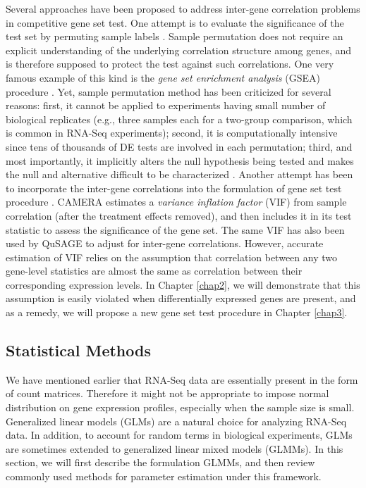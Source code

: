 Several approaches have been proposed to address inter-gene correlation problems in competitive gene
set test. One attempt is to evaluate the significance of the test set by permuting sample labels
\citep{efron2007testing,gatti2010heading,subramanian2005gene}. Sample permutation does not require
an explicit understanding of the underlying correlation structure among genes, and is therefore
supposed to protect the test against such correlations. One very famous example of this kind is the
\textit{gene set enrichment analysis} (GSEA) procedure \citep{subramanian2005gene}. Yet, sample
permutation method has been criticized for several reasons: first, it cannot be applied to
experiments having small
number of biological replicates (e.g., three samples each for a two-group comparison, which is common in RNA-Seq experiments);
second, it is computationally intensive since tens of thousands of DE tests are involved in each permutation; 
third, and most importantly, it implicitly alters the null hypothesis being tested and makes the null and
alternative difficult to be characterized \citep{goeman2007analyzing, khatri2012ten, wu2012camera}.
Another attempt has been to incorporate the inter-gene correlations into the formulation of gene set
test procedure \citep{wu2012camera,yaari2013quantitative}. CAMERA \citep{wu2012camera} estimates a
\textit{variance
	inflation factor} (VIF) from sample correlation (after the treatment effects removed), and then
includes it in its test statistic to assess the significance of the gene set. The same VIF has also 
been used by QuSAGE
\cite{yaari2013quantitative} 
to adjust for inter-gene correlations. However, accurate estimation of VIF relies on
the assumption that correlation between any two gene-level statistics are almost the same as
correlation between their corresponding expression levels. In Chapter \ref{chap2}, we will
demonstrate that this assumption is easily violated when differentially expressed genes are present,
and as a remedy, we will propose a new gene set test procedure in Chapter \ref{chap3}.  

\subsection{Statistical Methods}\label{subsec:glmm}
We have mentioned earlier that RNA-Seq data are essentially present in the form of count matrices. 
Therefore it might not be appropriate to impose normal distribution on gene expression profiles, 
especially when the sample size is small. Generalized linear models (GLMs) are a natural choice for 
analyzing RNA-Seq data. In addition, to account for random terms in biological experiments, GLMs 
are 
sometimes extended to generalized linear mixed models (GLMMs).
In this section, we will first describe the formulation GLMMs,
and then review commonly used methods for parameter estimation under this framework.

